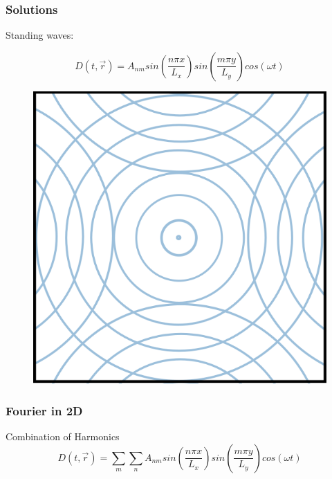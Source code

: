 \documentclass[]{beamer}
\begin{document}



\begin{frame}
  \frametitle{Solutions}
  
Standing waves:

\begin{equation*}
  D(t,\vec{r})=A_{nm}sin(\frac{n\pi x}{L_x})sin(\frac{m\pi y}{L_y})cos(\omega t)
\end{equation*}

  \begin{figure}[h!]
    \begin{center}
      \includegraphics[height=2.in]{images4/top_view2.png}
    \end{center}
  \end{figure}
  

  

    \end{frame}

    
  
  
    \begin{frame}
      \frametitle{Fourier in 2D }
      Combination of Harmonics
      \begin{equation*}
        D(t,\vec{r})=\sum_m\sum_n  A_{nm}sin(\frac{n\pi x}{L_x})sin(\frac{m\pi y}{L_y})cos(\omega t)
      \end{equation*}
      
      

    
      \end{frame}



\end{document}
